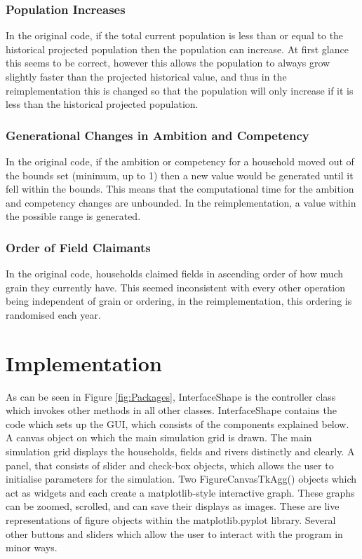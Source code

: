 \documentclass[12pt]{article}
\begin{document}
				\subsubsection{Population Increases}
				In the original code, if the total current population is less than or equal to the historical projected population then the population can increase. At first glance this seems to be correct, however this allows the population to always grow slightly faster than the projected historical value, and thus in the reimplementation this is changed so that the population will only increase if it is less than the historical projected population.\\
				\subsubsection{Generational Changes in Ambition and Competency}
				In the original code, if the ambition or competency for a household moved out of the bounds set (minimum, up to 1) then a new value would be generated until it fell within the bounds. This means that the computational time for the ambition and competency changes are unbounded. In the reimplementation, a value within the possible range is generated.\\
				\subsubsection{Order of Field Claimants}
				In the original code, households claimed fields in ascending order of how much grain they currently have. This seemed inconsistent with every other operation being independent of grain or ordering, in the reimplementation, this ordering is randomised each year.
	\section{Implementation}
		As can be seen in Figure \ref{fig:Packages}, InterfaceShape is the controller class which invokes other methods in all other classes. InterfaceShape contains the code which sets up the GUI, which consists of the components explained below.\\		
		A canvas object on which the main simulation grid is drawn. The main simulation grid displays the households, fields and rivers distinctly and clearly. A panel, that consists of slider and check-box objects, which allows the user to initialise parameters for the simulation. Two FigureCanvasTkAgg() objects which act as widgets and each create a matplotlib-style interactive graph. These graphs can be zoomed, scrolled, and can save their displays as images. These are live representations of figure objects within the matplotlib.pyplot library. Several other buttons and sliders which allow the user to interact with the program in minor ways.\\
		
\end{document}

